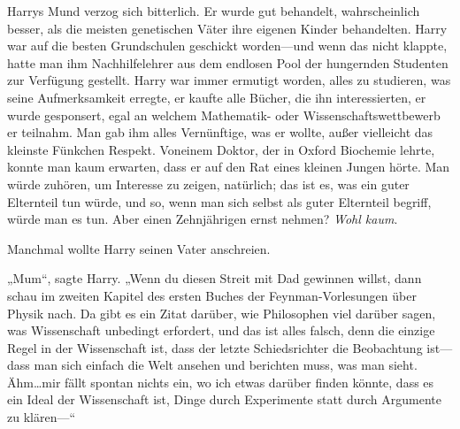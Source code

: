 Harrys Mund verzog sich bitterlich. Er wurde gut behandelt, wahrscheinlich besser, als die meisten genetischen Väter ihre eigenen Kinder behandelten. Harry war auf die besten Grundschulen geschickt worden—und wenn das nicht klappte, hatte man ihm Nachhilfelehrer aus dem endlosen Pool der hungernden Studenten zur Verfügung gestellt. Harry war immer ermutigt worden, alles zu studieren, was seine Aufmerksamkeit erregte, er kaufte alle Bücher, die ihn interessierten, er wurde gesponsert, egal an welchem Mathematik- oder Wissenschaftswettbewerb er teilnahm. Man gab ihm alles Vernünftige, was er wollte, außer vielleicht das kleinste Fünkchen Respekt. Voneinem Doktor, der in Oxford Biochemie lehrte, konnte man kaum erwarten, dass er auf den Rat eines kleinen Jungen hörte. Man würde zuhören, um Interesse zu zeigen, natürlich; das ist es, was ein guter Elternteil tun würde, und so, wenn man sich selbst als guter Elternteil begriff, würde man es tun. Aber einen Zehnjährigen ernst nehmen? \emph{Wohl kaum}.

Manchmal wollte Harry seinen Vater anschreien.

„Mum“, sagte Harry. „Wenn du diesen Streit mit Dad gewinnen willst, dann schau im zweiten Kapitel des ersten Buches der Feynman-Vorlesungen über Physik nach. Da gibt es ein Zitat darüber, wie Philosophen viel darüber sagen, was Wissenschaft unbedingt erfordert, und das ist alles falsch, denn die einzige Regel in der Wissenschaft ist, dass der letzte Schiedsrichter die Beobachtung ist—dass man sich einfach die Welt ansehen und berichten muss, was man sieht. Ähm…mir fällt spontan nichts ein, wo ich etwas darüber finden könnte, dass es ein Ideal der Wissenschaft ist, Dinge durch Experimente statt durch Argumente zu klären—“

